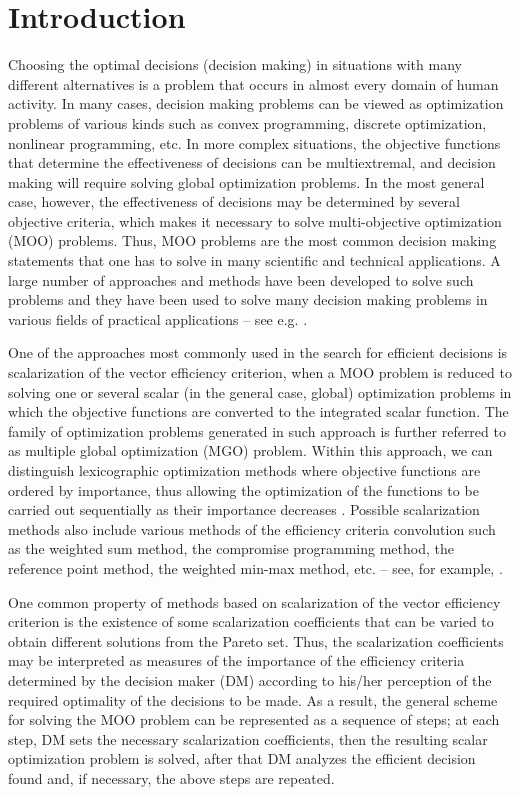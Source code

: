 \documentclass[runningheads]{llncs}
\begin{document}
\section{Introduction} \label{sec:01}


Choosing the optimal decisions (decision making) in situations with many different alternatives is a problem that occurs in almost every domain of human activity. In many cases, decision making problems can be viewed as optimization problems of various kinds such as convex programming, discrete optimization, nonlinear programming, etc. In more complex situations, the objective functions that determine the effectiveness of decisions can be multiextremal, and decision making will require solving global optimization problems. In the most general case, however, the effectiveness of decisions may be determined by several objective criteria, which makes it necessary to solve multi-objective optimization (MOO) problems. Thus, MOO problems are the most common decision making statements that one has to solve in many scientific and technical applications. A large number of approaches and methods have been developed to solve such problems and they have been used to solve many decision making problems in various fields of practical applications -- see e.g. \cite{c1,c2,c3,c4,c5,c6,c7,c8,c9}.

One of the approaches most commonly used in the search for efficient decisions is scalarization of the vector efficiency criterion, when a MOO problem is reduced to solving one or several scalar (in the general case, global) optimization problems in which the objective functions are converted to the integrated scalar function. The family of optimization problems generated in such approach is further referred to as multiple global optimization (MGO) problem. Within this approach, we can distinguish lexicographic optimization methods where objective functions are ordered by importance, thus  allowing the optimization of the functions to be carried out sequentially as their importance decreases \cite{c10}. Possible scalarization methods also include various methods of the efficiency criteria convolution such as the weighted sum method, the compromise programming method, the reference point method, the weighted min-max method, etc. -- see, for example, \cite{c2,c11,c12}. 

One common property of methods based on scalarization of the vector efficiency criterion is the existence of some scalarization coefficients that can be varied to obtain different solutions from the Pareto set. Thus, the scalarization coefficients may be interpreted as measures of the importance of the efficiency criteria determined by the decision maker (DM) according to his/her perception of the required optimality of the decisions to be made. As a result, the general scheme for solving the MOO problem can be represented as a sequence of steps; at each step, DM sets the necessary scalarization coefficients, then the resulting scalar optimization problem is solved, after that DM analyzes the efficient decision found and, if necessary, the above steps are repeated.
\end{document}
